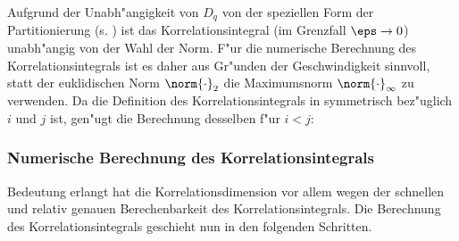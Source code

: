Aufgrund der Unabh"angigkeit von $D_q$ von der speziellen Form der Partitionierung
(s. ) ist das Korrelationsintegral (im Grenzfall $\eps\to0$) unabh"angig von
der Wahl der Norm. F"ur die numerische Berechnung des Korrelationsintegrals ist es daher
aus Gr"unden der Geschwindigkeit sinnvoll, statt der euklidischen Norm $\norm{\cdot}_2$ die
Maximumsnorm $\norm{\cdot}_\infty$ zu verwenden. Da die Definition des
Korrelationsintegrals in  symmetrisch bez"uglich $i$ und $j$ ist, gen"ugt
die Berechnung desselben f"ur $i<j$:



\subsubsection{Numerische Berechnung des Korrelationsintegrals}
Bedeutung erlangt hat die Korrelationsdimension vor allem wegen der schnellen und
relativ genauen Berechenbarkeit des Korrelationsintegrals. 
Die Berechnung des Korrelationsintegrals geschieht nun in den folgenden Schritten.
